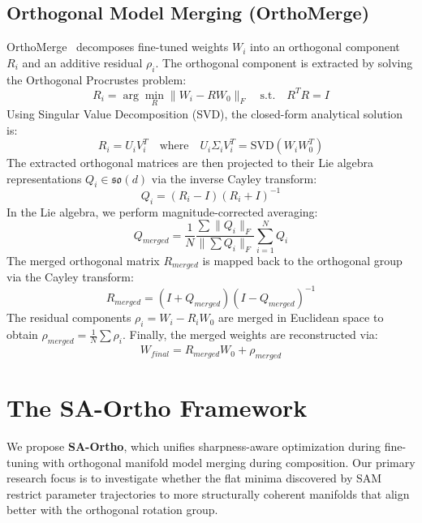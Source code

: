 \documentclass{article}
\begin{document}
\subsection{Orthogonal Model Merging (OrthoMerge)}
OrthoMerge~\cite{yang2026orthomerge} decomposes fine-tuned weights $W_i$ into an orthogonal component $R_i$ and an additive residual $\rho_i$.
The orthogonal component is extracted by solving the Orthogonal Procrustes problem:
\begin{equation}
    R_i = \arg\min_{R} \|W_i - R W_0\|_F \quad \text{s.t.} \quad R^T R = I
\end{equation}
Using Singular Value Decomposition (SVD), the closed-form analytical solution is:
\begin{equation}
    R_i = U_i V_i^T \quad \text{where} \quad U_i \Sigma_i V_i^T = \text{SVD}(W_i W_0^T)
\end{equation}
The extracted orthogonal matrices are then projected to their Lie algebra representations $Q_i \in \mathfrak{so}(d)$ via the inverse Cayley transform:
\begin{equation}
    Q_i = (R_i - I)(R_i + I)^{-1}
\end{equation}
In the Lie algebra, we perform magnitude-corrected averaging:
\begin{equation}
    Q_{merged} = \frac{1}{N} \frac{\sum \|Q_i\|_F}{\|\sum Q_i\|_F} \sum_{i=1}^{N} Q_i
\end{equation}
The merged orthogonal matrix $R_{merged}$ is mapped back to the orthogonal group via the Cayley transform:
\begin{equation}
    R_{merged} = (I + Q_{merged})(I - Q_{merged})^{-1}
\end{equation}
The residual components $\rho_i = W_i - R_i W_0$ are merged in Euclidean space to obtain $\rho_{merged} = \frac{1}{N} \sum \rho_i$. 
Finally, the merged weights are reconstructed via:
\begin{equation}
    W_{final} = R_{merged} W_0 + \rho_{merged}
\end{equation}

\section{The SA-Ortho Framework}
\label{sec:sa-ortho}

We propose \textbf{SA-Ortho}, which unifies sharpness-aware optimization during fine-tuning with orthogonal manifold model merging during composition. 
Our primary research focus is to investigate whether the flat minima discovered by SAM restrict parameter trajectories to more structurally coherent manifolds that align better with the orthogonal rotation group.
\end{document}
